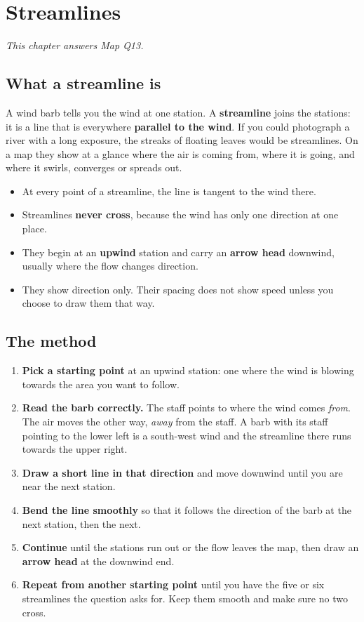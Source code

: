 \chapter{Streamlines}\label{p3-ch:stream}

\textit{This chapter answers Map Q13.}

\section{What a streamline is}

A wind barb tells you the wind at one station. A \textbf{streamline} joins the stations: it is a line that is everywhere \textbf{parallel to the wind}. If you could photograph a river with a long exposure, the streaks of floating leaves would be streamlines. On a map they show at a glance where the air is coming from, where it is going, and where it swirls, converges or spreads out.

\begin{itemize}
\item At every point of a streamline, the line is tangent to the wind there.
\item Streamlines \textbf{never cross}, because the wind has only one direction at one place.
\item They begin at an \textbf{upwind} station and carry an \textbf{arrow head} downwind, usually where the flow changes direction.
\item They show direction only. Their spacing does not show speed unless you choose to draw them that way.
\end{itemize}

\section{The method}

\begin{enumerate}[label=\textbf{Step \arabic*.},leftmargin=*,itemsep=4pt]
\item \textbf{Pick a starting point} at an upwind station: one where the wind is blowing towards the area you want to follow.
\item \textbf{Read the barb correctly.} The staff points to where the wind comes \emph{from}. The air moves the other way, \emph{away} from the staff. A barb with its staff pointing to the lower left is a south-west wind and the streamline there runs towards the upper right.
\item \textbf{Draw a short line in that direction} and move downwind until you are near the next station.
\item \textbf{Bend the line smoothly} so that it follows the direction of the barb at the next station, then the next.
\item \textbf{Continue} until the stations run out or the flow leaves the map, then draw an \textbf{arrow head} at the downwind end.
\item \textbf{Repeat from another starting point} until you have the five or six streamlines the question asks for. Keep them smooth and make sure no two cross.
\end{enumerate}

